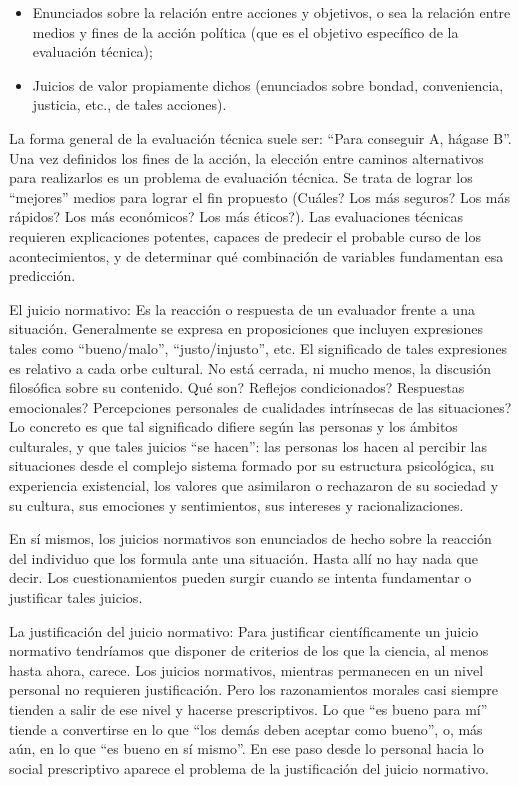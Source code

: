 \documentclass[
]{book}
\providecommand{\tightlist}{%
  \setlength{\itemsep}{0pt}\setlength{\parskip}{0pt}}
\begin{document}
\begin{itemize}
\tightlist
\item
  Enunciados sobre la relación entre acciones y objetivos, o sea la relación entre medios y fines de la acción política (que es el objetivo específico de la evaluación técnica);
\item
  Juicios de valor propiamente dichos (enunciados sobre bondad, conveniencia, justicia, etc., de tales acciones).
\end{itemize}

La forma general de la evaluación técnica suele ser: ``Para conseguir A, hágase B''. Una vez definidos los fines de la acción, la elección entre caminos alternativos para realizarlos es un problema de evaluación técnica. Se trata de lograr los ``mejores'' medios para lograr el fin propuesto (Cuáles? Los más seguros? Los más rápidos? Los más económicos? Los más éticos?). Las evaluaciones técnicas requieren explicaciones potentes, capaces de predecir el probable curso de los acontecimientos, y de determinar qué combinación de variables fundamentan esa predicción.

El juicio normativo: Es la reacción o respuesta de un evaluador frente a una situación. Generalmente se expresa en proposiciones que incluyen expresiones tales como ``bueno/malo'', ``justo/injusto'', etc. El significado de tales expresiones es relativo a cada orbe cultural. No está cerrada, ni mucho menos, la discusión filosófica sobre su contenido. Qué son? Reflejos condicionados? Respuestas emocionales? Percepciones personales de cualidades intrínsecas de las situaciones? Lo concreto es que tal significado difiere según las personas y los ámbitos culturales, y que tales juicios ``se hacen'': las personas los hacen al percibir las situaciones desde el complejo sistema formado por su estructura psicológica, su experiencia existencial, los valores que asimilaron o rechazaron de su sociedad y su cultura, sus emociones y sentimientos, sus intereses y racionalizaciones.

En sí mismos, los juicios normativos son enunciados de hecho sobre la reacción del individuo que los formula ante una situación. Hasta allí no hay nada que decir. Los cuestionamientos pueden surgir cuando se intenta fundamentar o justificar tales juicios.

La justificación del juicio normativo: Para justificar científicamente un juicio normativo tendríamos que disponer de criterios de los que la ciencia, al menos hasta ahora, carece. Los juicios normativos, mientras permanecen en un nivel personal no requieren justificación. Pero los razonamientos morales casi siempre tienden a salir de ese nivel y hacerse prescriptivos. Lo que ``es bueno para mí'' tiende a convertirse en lo que ``los demás deben aceptar como bueno'', o, más aún, en lo que ``es bueno en sí mismo''. En ese paso desde lo personal hacia lo social prescriptivo aparece el problema de la justificación del juicio normativo.
\end{document}
